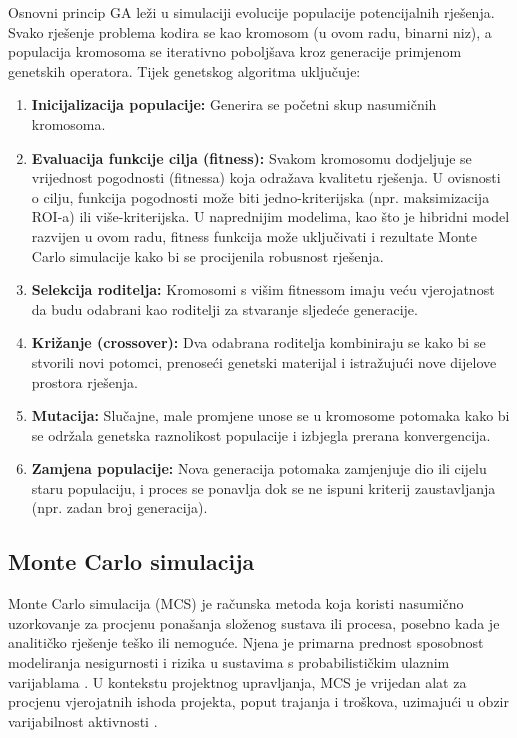 Osnovni princip GA leži u simulaciji evolucije populacije potencijalnih rješenja. Svako rješenje problema kodira se kao kromosom (u ovom radu, binarni niz), a populacija kromosoma se iterativno poboljšava kroz generacije primjenom genetskih operatora. Tijek genetskog algoritma uključuje:
\begin{enumerate}
    \item \textbf{Inicijalizacija populacije:} Generira se početni skup nasumičnih kromosoma.
    \item \textbf{Evaluacija funkcije cilja (fitness):} Svakom kromosomu dodjeljuje se vrijednost pogodnosti (fitnessa) koja odražava kvalitetu rješenja. U ovisnosti o cilju, funkcija pogodnosti može biti jedno-kriterijska (npr. maksimizacija ROI-a) ili više-kriterijska. U naprednijim modelima, kao što je hibridni model razvijen u ovom radu, fitness funkcija može uključivati i rezultate Monte Carlo simulacije kako bi se procijenila robusnost rješenja.
    \item \textbf{Selekcija roditelja:} Kromosomi s višim fitnessom imaju veću vjerojatnost da budu odabrani kao roditelji za stvaranje sljedeće generacije.
    \item \textbf{Križanje (crossover):} Dva odabrana roditelja kombiniraju se kako bi se stvorili novi potomci, prenoseći genetski materijal i istražujući nove dijelove prostora rješenja.
    \item \textbf{Mutacija:} Slučajne, male promjene unose se u kromosome potomaka kako bi se održala genetska raznolikost populacije i izbjegla prerana konvergencija.
    \item \textbf{Zamjena populacije:} Nova generacija potomaka zamjenjuje dio ili cijelu staru populaciju, i proces se ponavlja dok se ne ispuni kriterij zaustavljanja (npr. zadan broj generacija).
\end{enumerate}

\subsection{Monte Carlo simulacija}
Monte Carlo simulacija (MCS) je računska metoda koja koristi nasumično uzorkovanje za procjenu ponašanja složenog sustava ili procesa, posebno kada je analitičko rješenje teško ili nemoguće. Njena je primarna prednost sposobnost modeliranja nesigurnosti i rizika u sustavima s probabilističkim ulaznim varijablama \cite{Vose2008}. U kontekstu projektnog upravljanja, MCS je vrijedan alat za procjenu vjerojatnih ishoda projekta, poput trajanja i troškova, uzimajući u obzir varijabilnost aktivnosti \cite{Miller2009, Avlijas2008}.

